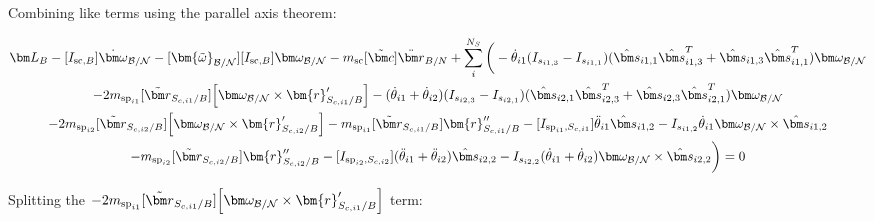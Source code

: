Combining like terms using the parallel axis theorem:

\begin{multline}
	\bm L_B -[I_{\text{sc},B}] \dot{\bm\omega}_{\cal B/N} -[\bm{\tilde{\omega}}_{\cal B/N}] [I_{\text{sc},B}] \bm\omega_{\cal B/N}
	- m_{\text{sc}} [\tilde{\bm c}] \ddot{\bm r}_{B/N}
	+ \sum\limits_{i}^{N_S}\bigg( -\dot{\theta}_{i1} (I_{s_{i1,3}} - I_{s_{i1,1}})( \hat{\bm s}_{i1,1} \hat{\bm s}_{i1,3}^T + \hat{\bm s}_{i1,3} \hat{\bm s}_{i1,1}^T) \bm \omega_{\cal{B/N}} \\
	-2 m_{\text{sp}_{i1}} [\tilde{{\bm r}}_{S_{c,i1}/B}] \Big[\bm\omega_{\cal B/N} \times \bm{r}'_{S_{c,i1}/B}\Big] -(\dot{\theta}_{i1}  + \dot{\theta}_{i2})(I_{s_{i2,3}} - I_{s_{i2,1}}) (\hat{\bm s}_{i2,1} \hat{\bm s}_{i2,3}^T + \hat{\bm s}_{i2,3} \hat{\bm s}_{i2,1}^T) \bm \omega_{\cal{B/N}}
	\\
	- 2 m_{\text{sp}_{i2}} [\tilde{{\bm r}}_{S_{c,i2}/B}] \Big[ \bm\omega_{\cal B/N} \times \bm{r}'_{S_{c,i2}/B}\Big]
	- m_{\text{sp}_{i1}} [\tilde{{\bm r}}_{S_{c,i1}/B}] \bm{r}''_{S_{c,i1}/B}
	-[I_{\text{sp}_{i1},S_{c,i1}}] \ddot{\theta}_{i1} \hat{\bm s}_{i1,2}
	-I_{s_{i1,2}} \dot{\theta}_{i1} \bm \omega_{\cal{B/N}} \times \hat{\bm s}_{i1,2}
	\\- m_{\text{sp}_{i2}} [\tilde{{\bm r}}_{S_{c,i2}/B}] \bm{r}''_{S_{c,i2}/B}
	-[I_{\text{sp}_{i2},S_{c,i2}}] (\ddot{\theta}_{i1}  + \ddot{\theta}_{i2})\hat{\bm s}_{i2,2}
	-I_{s_{i2,2}}  (\dot{\theta}_{i1}  + \dot{\theta}_{i2}) \bm \omega_{\cal{B/N}} \times \hat{\bm s}_{i2,2} \bigg) = 0
\end{multline}

Splitting the $-2 m_{\text{sp}_{i1}} [\tilde{{\bm r}}_{S_{c,i1}/B}] \Big[\bm\omega_{\cal B/N} \times \bm{r}'_{S_{c,i1}/B}\Big]$ term:

